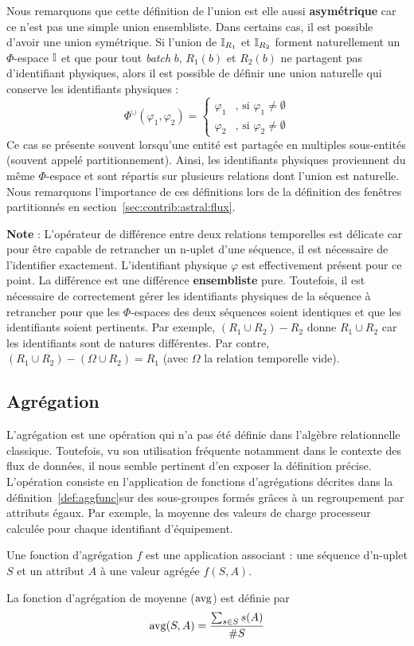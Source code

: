 Nous remarquons que cette définition de l'union est elle aussi \textbf{asymétrique} car ce n'est pas une simple union ensembliste. Dans certains cas, il est possible d'avoir une union symétrique. Si l'union de $\mathbb{I}_{R_1}$ et $\mathbb{I}_{R_2}$ forment naturellement un $\Phi$-espace $\mathbb{I}$ et que pour tout \textit{batch} $b$, $R_1(b)$ et $R_2(b)$ ne partagent pas d'identifiant physiques, alors il est possible de définir une union naturelle qui conserve les identifiants physiques : $$\Phi^\cup(\varphi_1,\varphi_2) = \begin{cases} \varphi_1 & \textrm{, si }\varphi_1 \neq \emptyset \\\varphi_2 &\textrm{, si }\varphi_2 \neq \emptyset\end{cases}$$
Ce cas se présente souvent lorsqu'une entité est partagée en multiples sous-entités (souvent appelé partitionnement). Ainsi, les identifiants physiques proviennent du même $\Phi$-espace et sont répartis sur plusieurs relations dont l'union est naturelle. Nous remarquons l'importance de ces définitions lors de la définition des fenêtres partitionnés en section~\ref{sec:contrib:astral:flux}.

\textbf{Note} : L'opérateur de différence entre deux relations temporelles est délicate car pour être capable de retrancher un n-uplet d'une séquence, il est nécessaire de l'identifier exactement. L'identifiant physique $\varphi$ est effectivement présent pour ce point. La différence est une différence \textbf{ensembliste} pure. Toutefois, il est nécessaire de correctement gérer les identifiants physiques de la séquence à retrancher pour que les $\Phi$-espaces des deux séquences soient identiques et que les identifiants soient pertinents. Par exemple, $(R_1\cup R_2)-R_2$ donne $R_1\cup R_2$ car les identifiants sont de natures différentes. Par contre, $(R_1\cup R_2)-(\Omega \cup R_2)=R_1$ (avec $\Omega$ la relation temporelle vide).

\subsection{Agrégation}
L'agrégation est une opération qui n'a pas été définie dans l'algèbre relationnelle classique. Toutefois, vu son utilisation fréquente notamment dans le contexte des flux de données, il nous semble pertinent d'en exposer la définition précise. L'opération consiste en l'application de fonctions d'agrégations décrites dans la définition~\ref{def:aggfunc}sur des sous-groupes formés grâces à un regroupement par attributs égaux. Par exemple, la moyenne des valeurs de charge processeur calculée pour chaque identifiant d'équipement. 
\begin{defi}\label{def:aggfunc}
    Une fonction d'agrégation $f$ est une application associant : une séquence d'n-uplet $S$ et un attribut $A$ à une valeur agrégée $f(S,A)$.
\end{defi}
\begin{example}
    La fonction d'agrégation de moyenne ($\mathrm{avg}$) est définie par $$\mathrm{avg}(S,A) = \frac{\sum_{s\in S} s(A)}{\# S}$$
\end{example}

